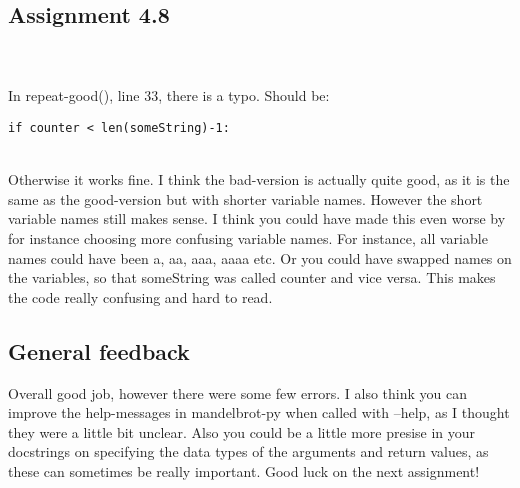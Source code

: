 \documentclass[a4paper]{article}
\begin{document}
\subsection*{Assignment 4.8}
\text \\ \\ In repeat-good(), line 33, there is a typo. Should be:
\begin{verbatim}
if counter < len(someString)-1:
\end{verbatim}
\text \\ Otherwise it works fine. I think the bad-version is actually quite good, as it is the same as the good-version but with shorter variable names. However the short variable names still makes sense. I think you could have made this even worse by for instance choosing more confusing variable names. For instance, all variable names could have been a, aa, aaa, aaaa etc. Or you could have swapped names on the variables, so that someString was called counter and vice versa. This makes the code really confusing and hard to read.


\subsection*{General feedback}
\text Overall good job, however there were some few errors. I also think you can improve the help-messages in mandelbrot-py when called with --help, as I thought they were a little bit unclear. Also you could be a little more presise in your docstrings on specifying the data types of the arguments and return values, as these can sometimes be really important. \newline \newline
Good luck on the next assignment!



\end{document}
